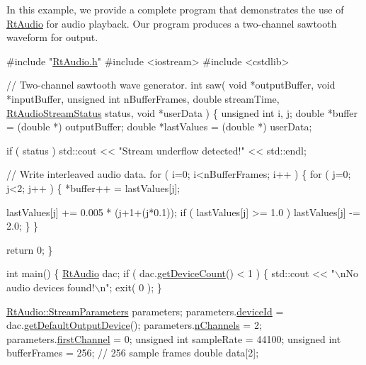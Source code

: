 In this example, we provide a complete program that demonstrates the use of \hyperlink{class_rt_audio}{Rt\+Audio} for audio playback. Our program produces a two-\/channel sawtooth waveform for output.


\begin{DoxyCode}
\textcolor{preprocessor}{#include "\hyperlink{_rt_audio_8h}{RtAudio.h}"}
\textcolor{preprocessor}{#include <iostream>}
\textcolor{preprocessor}{#include <cstdlib>}

\textcolor{comment}{// Two-channel sawtooth wave generator.}
\textcolor{keywordtype}{int} saw( \textcolor{keywordtype}{void} *outputBuffer, \textcolor{keywordtype}{void} *inputBuffer, \textcolor{keywordtype}{unsigned} \textcolor{keywordtype}{int} nBufferFrames,
         \textcolor{keywordtype}{double} streamTime, \hyperlink{_rt_audio_8h_a80e306d363583da3b0a1b65d9b57c806}{RtAudioStreamStatus} status, \textcolor{keywordtype}{void} *userData )
\{
  \textcolor{keywordtype}{unsigned} \textcolor{keywordtype}{int} i, j;
  \textcolor{keywordtype}{double} *buffer = (\textcolor{keywordtype}{double} *) outputBuffer;
  \textcolor{keywordtype}{double} *lastValues = (\textcolor{keywordtype}{double} *) userData;

  \textcolor{keywordflow}{if} ( status )
    std::cout << \textcolor{stringliteral}{"Stream underflow detected!"} << std::endl;

  \textcolor{comment}{// Write interleaved audio data.}
  \textcolor{keywordflow}{for} ( i=0; i<nBufferFrames; i++ ) \{
    \textcolor{keywordflow}{for} ( j=0; j<2; j++ ) \{
      *buffer++ = lastValues[j];

      lastValues[j] += 0.005 * (j+1+(j*0.1));
      \textcolor{keywordflow}{if} ( lastValues[j] >= 1.0 ) lastValues[j] -= 2.0;
    \}
  \}

  \textcolor{keywordflow}{return} 0;
\}

\textcolor{keywordtype}{int} main()
\{
  \hyperlink{class_rt_audio}{RtAudio} dac;
  \textcolor{keywordflow}{if} ( dac.\hyperlink{class_rt_audio_a747ce2d73803641bbb66d6e78092aa1a}{getDeviceCount}() < 1 ) \{
    std::cout << \textcolor{stringliteral}{"\(\backslash\)nNo audio devices found!\(\backslash\)n"};
    exit( 0 );
  \}

  \hyperlink{struct_rt_audio_1_1_stream_parameters}{RtAudio::StreamParameters} parameters;
  parameters.\hyperlink{struct_rt_audio_1_1_stream_parameters_ab3c72bcf3ef12149ae9a4fb597cc5489}{deviceId} = dac.\hyperlink{class_rt_audio_a3a3f3dbe13ea696b521e49cdaaa357bc}{getDefaultOutputDevice}();
  parameters.\hyperlink{struct_rt_audio_1_1_stream_parameters_a88a10091b6e284e21235cc6f25332ebd}{nChannels} = 2;
  parameters.\hyperlink{struct_rt_audio_1_1_stream_parameters_ad4b4503782653ec93c83328c46abe50c}{firstChannel} = 0;
  \textcolor{keywordtype}{unsigned} \textcolor{keywordtype}{int} sampleRate = 44100;
  \textcolor{keywordtype}{unsigned} \textcolor{keywordtype}{int} bufferFrames = 256; \textcolor{comment}{// 256 sample frames}
  \textcolor{keywordtype}{double} data[2];


\end{DoxyCode}
